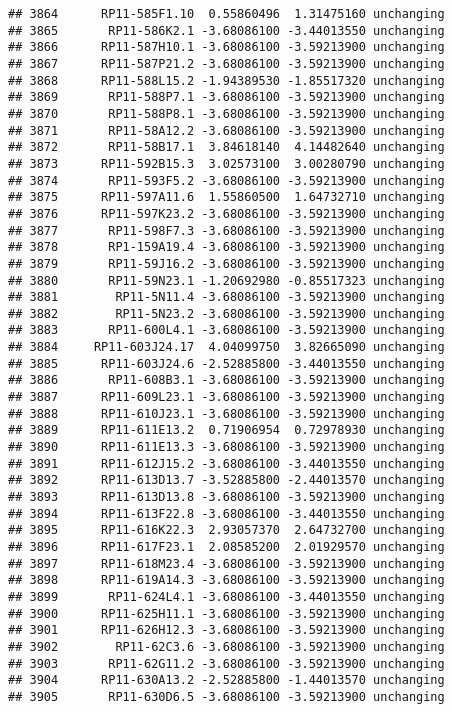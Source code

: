 \documentclass[]{article}
\begin{document}
\begin{verbatim}
## 3864      RP11-585F1.10  0.55860496  1.31475160 unchanging
## 3865       RP11-586K2.1 -3.68086100 -3.44013550 unchanging
## 3866      RP11-587H10.1 -3.68086100 -3.59213900 unchanging
## 3867      RP11-587P21.2 -3.68086100 -3.59213900 unchanging
## 3868      RP11-588L15.2 -1.94389530 -1.85517320 unchanging
## 3869       RP11-588P7.1 -3.68086100 -3.59213900 unchanging
## 3870       RP11-588P8.1 -3.68086100 -3.59213900 unchanging
## 3871       RP11-58A12.2 -3.68086100 -3.59213900 unchanging
## 3872       RP11-58B17.1  3.84618140  4.14482640 unchanging
## 3873      RP11-592B15.3  3.02573100  3.00280790 unchanging
## 3874       RP11-593F5.2 -3.68086100 -3.59213900 unchanging
## 3875      RP11-597A11.6  1.55860500  1.64732710 unchanging
## 3876      RP11-597K23.2 -3.68086100 -3.59213900 unchanging
## 3877       RP11-598F7.3 -3.68086100 -3.59213900 unchanging
## 3878       RP1-159A19.4 -3.68086100 -3.59213900 unchanging
## 3879       RP11-59J16.2 -3.68086100 -3.59213900 unchanging
## 3880       RP11-59N23.1 -1.20692980 -0.85517323 unchanging
## 3881        RP11-5N11.4 -3.68086100 -3.59213900 unchanging
## 3882        RP11-5N23.2 -3.68086100 -3.59213900 unchanging
## 3883       RP11-600L4.1 -3.68086100 -3.59213900 unchanging
## 3884     RP11-603J24.17  4.04099750  3.82665090 unchanging
## 3885      RP11-603J24.6 -2.52885800 -3.44013550 unchanging
## 3886       RP11-608B3.1 -3.68086100 -3.59213900 unchanging
## 3887      RP11-609L23.1 -3.68086100 -3.59213900 unchanging
## 3888      RP11-610J23.1 -3.68086100 -3.59213900 unchanging
## 3889      RP11-611E13.2  0.71906954  0.72978930 unchanging
## 3890      RP11-611E13.3 -3.68086100 -3.59213900 unchanging
## 3891      RP11-612J15.2 -3.68086100 -3.44013550 unchanging
## 3892      RP11-613D13.7 -3.52885800 -2.44013570 unchanging
## 3893      RP11-613D13.8 -3.68086100 -3.59213900 unchanging
## 3894      RP11-613F22.8 -3.68086100 -3.44013550 unchanging
## 3895      RP11-616K22.3  2.93057370  2.64732700 unchanging
## 3896      RP11-617F23.1  2.08585200  2.01929570 unchanging
## 3897      RP11-618M23.4 -3.68086100 -3.59213900 unchanging
## 3898      RP11-619A14.3 -3.68086100 -3.59213900 unchanging
## 3899       RP11-624L4.1 -3.68086100 -3.44013550 unchanging
## 3900      RP11-625H11.1 -3.68086100 -3.59213900 unchanging
## 3901      RP11-626H12.3 -3.68086100 -3.59213900 unchanging
## 3902        RP11-62C3.6 -3.68086100 -3.59213900 unchanging
## 3903       RP11-62G11.2 -3.68086100 -3.59213900 unchanging
## 3904      RP11-630A13.2 -2.52885800 -1.44013570 unchanging
## 3905       RP11-630D6.5 -3.68086100 -3.59213900 unchanging

\end{verbatim}
\end{document}
